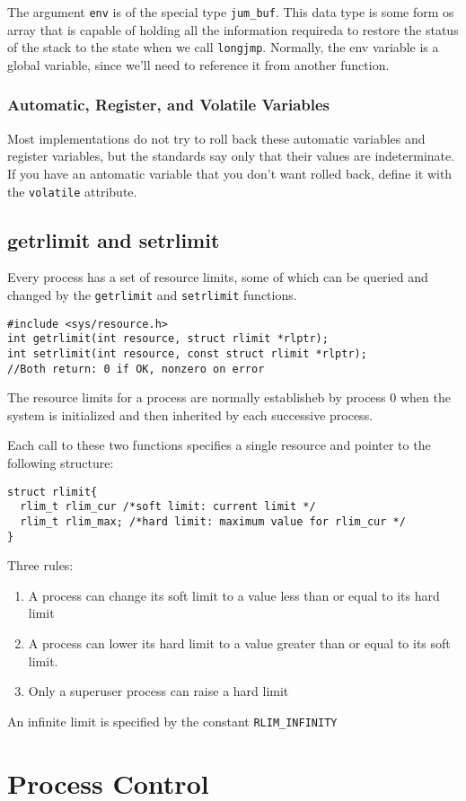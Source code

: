 \documentclass[a4paper,10pt]{book}
\begin{document}
The argument \verb|env| is of the special type \verb|jum_buf|. This data type is
some form os array that is capable of holding all the information requireda to
restore the status of the stack to the state when we call \verb|longjmp|.
Normally, the env variable is a global variable, since we'll need to reference
it from another function.
\subsection{Automatic, Register, and Volatile Variables}
Most implementations do not try to roll back these automatic variables and
register variables, but the standards say only that their values are
indeterminate. If you have an antomatic variable that you don't want rolled
back, define it with the \verb|volatile| attribute.
\section{getrlimit and setrlimit}
Every process has a set of resource limits, some of which can be queried and
changed by the \verb|getrlimit| and \verb|setrlimit| functions.
\begin{verbatim}
#include <sys/resource.h>
int getrlimit(int resource, struct rlimit *rlptr);
int setrlimit(int resource, const struct rlimit *rlptr);
//Both return: 0 if OK, nonzero on error
\end{verbatim}
The resource limits for a process are normally establisheb by process 0 when
the system is initialized and then inherited by each successive process.

Each call to these two functions specifies a single resource and pointer to the
following structure:
\begin{verbatim}
struct rlimit{
  rlim_t rlim_cur /*soft limit: current limit */
  rlim_t rlim_max; /*hard limit: maximum value for rlim_cur */
}
\end{verbatim}
Three rules:
\begin{enumerate}
\item A process can change its soft limit to a value less than or equal to its
hard limit
\item A process can lower its hard limit to a value greater than or equal to its
soft limit.
\item Only a superuser process can raise a hard limit
\end{enumerate}
An infinite limit is specified by the constant \verb|RLIM_INFINITY|
\chapter{Process Control}
\end{document}
